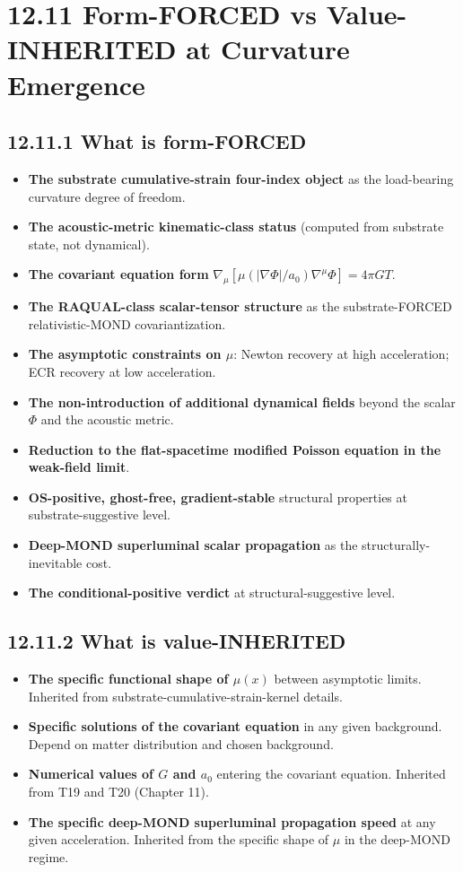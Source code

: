 \documentclass[11pt]{book}
\begin{document}
\section{12.11 Form-FORCED vs Value-INHERITED at Curvature Emergence}

\subsection{12.11.1 What is form-FORCED}

\begin{itemize}
\item \textbf{The substrate cumulative-strain four-index object} as the load-bearing curvature degree of freedom.
\item \textbf{The acoustic-metric kinematic-class status} (computed from substrate state, not dynamical).
\item \textbf{The covariant equation form} $\nabla_\mu[\mu(|\nabla\Phi|/a_0)\nabla^\mu\Phi] = 4\pi G T$.
\item \textbf{The RAQUAL-class scalar-tensor structure} as the substrate-FORCED relativistic-MOND covariantization.
\item \textbf{The asymptotic constraints on $\mu$}: Newton recovery at high acceleration; ECR recovery at low acceleration.
\item \textbf{The non-introduction of additional dynamical fields} beyond the scalar $\Phi$ and the acoustic metric.
\item \textbf{Reduction to the flat-spacetime modified Poisson equation in the weak-field limit}.
\item \textbf{OS-positive, ghost-free, gradient-stable} structural properties at substrate-suggestive level.
\item \textbf{Deep-MOND superluminal scalar propagation} as the structurally-inevitable cost.
\item \textbf{The conditional-positive verdict} at structural-suggestive level.
\end{itemize}

\subsection{12.11.2 What is value-INHERITED}

\begin{itemize}
\item \textbf{The specific functional shape of $\mu(x)$} between asymptotic limits. Inherited from substrate-cumulative-strain-kernel details.
\item \textbf{Specific solutions of the covariant equation} in any given background. Depend on matter distribution and chosen background.
\item \textbf{Numerical values of $G$ and $a_0$} entering the covariant equation. Inherited from T19 and T20 (Chapter 11).
\item \textbf{The specific deep-MOND superluminal propagation speed} at any given acceleration. Inherited from the specific shape of $\mu$ in the deep-MOND regime.
\end{itemize}
\end{document}
